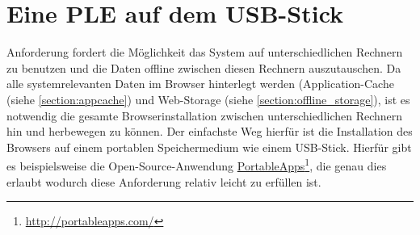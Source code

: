 \section{Eine PLE auf dem USB-Stick}\label{section:ple_auf_usb}
Anforderung  fordert die Möglichkeit das System auf unterschiedlichen Rechnern zu benutzen und die Daten offline zwischen diesen Rechnern auszutauschen. Da alle systemrelevanten Daten im Browser hinterlegt werden (Application-Cache (siehe \ref{section:appcache}) und Web-Storage (siehe \ref{section:offline_storage}), ist es notwendig die gesamte Browserinstallation zwischen unterschiedlichen Rechnern hin und herbewegen zu können. Der einfachste Weg hierfür ist die Installation des Browsers auf einem portablen Speichermedium wie einem USB-Stick. Hierfür gibt es beispielsweise die Open-Source-Anwendung \href{http://portableapps.com/}{PortableApps}\footnote{\url{http://portableapps.com/}}, die genau dies erlaubt wodurch diese Anforderung relativ leicht zu erfüllen ist. 

